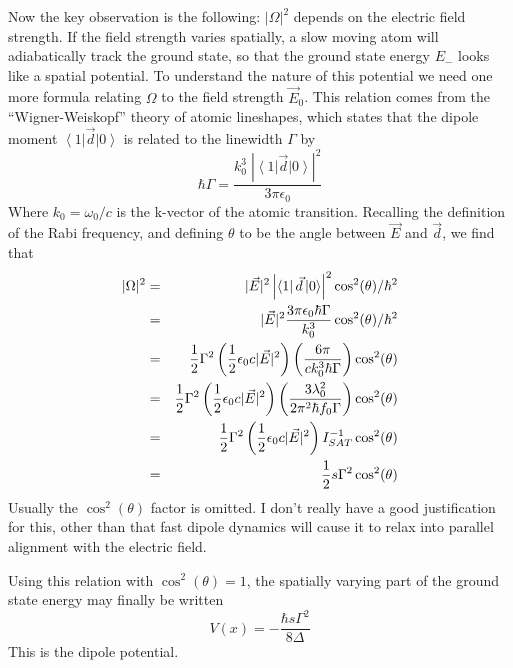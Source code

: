 \documentclass[aps,prb,floatfix,amsmath,amssymb,groupedaddress]{revtex4}
\begin{document}
Now the key observation is the following: $|\Omega|^2$ depends on the electric field strength.  If the field strength varies spatially, a slow moving atom will adiabatically track the ground state, so that the ground state energy $E_-$ looks like a spatial potential.  To understand the nature of this potential we need one more formula relating $\Omega$ to the field strength $\vec{E}_0$.  This relation comes from the ``Wigner-Weiskopf'' theory of atomic lineshapes, which states that the dipole moment $\left<1\right| \vec{d}\left|0\right>$ is related to the linewidth $\Gamma$ by $$\hbar\Gamma = \frac{k_0^3 \; |\left<1\right| \vec{d}\left|0\right>|^2}{3\pi\epsilon_0}$$ Where $k_0=\omega_0/c$ is the k-vector of the atomic transition.  Recalling the definition of the Rabi frequency, and defining $\theta$ to be the angle between $\vec{E}$ and $\vec{d}$, we find that 
\begin{eqnarray}
|\Omega|^2 & = & |\vec{E}|^2 \left| \left<1\right| \vec{d}\left|0\right>\right|^2 \cos^2(\theta) /\hbar^2 \\
& = & |\vec{E}|^2 \frac{3\pi\epsilon_0 \hbar\Gamma}{k_0^3}\cos^2(\theta)/\hbar^2 \\
& = & {\frac{1}{2}} \Gamma^2 \left({\frac{1}{2}} \epsilon_0 c |\vec{E}|^2\right) \left(\frac{6\pi}{ck_0^3 \hbar \Gamma}\right) \cos^2(\theta) \\
& = & {\frac{1}{2}} \Gamma^2 \left({\frac{1}{2}} \epsilon_0 c |\vec{E}|^2\right) \left(\frac{3\lambda_0^2}{2\pi^2\hbar f_0 \Gamma}\right) \cos^2(\theta) \\
& = & {\frac{1}{2}} \Gamma^2 \left({\frac{1}{2}} \epsilon_0 c |\vec{E}|^2\right) I_{SAT}^{-1} \cos^2(\theta) \\
& = & {\frac{1}{2}} s \Gamma^2 \cos^2(\theta)
\end{eqnarray}
Usually the $\cos^2(\theta)$ factor is omitted.  I don't really have a good justification for this, other than that fast dipole dynamics will cause it to relax into parallel alignment with the electric field. 

Using this relation with $\cos^2(\theta)=1$, the spatially varying part of the ground state energy may finally be written $$V(x) = -\frac{\hbar s \Gamma^2}{8\Delta}$$ This is the dipole potential. 
\end{document}
